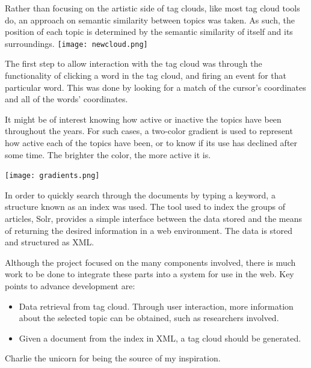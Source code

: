 \documentclass[a0paper, portrait]{baposter}
\begin{document}
\begin{poster}
   {
    Rather than focusing on the artistic side of tag clouds, like most tag cloud tools do, an approach on semantic similarity between topics was taken. As such, the position of each topic is determined by the semantic similarity of itself and its surroundings.
    \newline
    \texttt{[image: newcloud.png]}
  }

   {
    The first step to allow interaction with the tag cloud was through the functionality of clicking a word in the tag cloud, and firing an event for that particular word. This was done by looking for a match of the cursor's coordinates and all of the words' coordinates.  
  }

   {
    It might be of interest knowing how active or inactive the topics have been throughout the years. For such cases, a two-color gradient is used to represent how active each of the topics have been, or to know if its use has declined after some time. The brighter the color, the more active it is. %

    \texttt{[image: gradients.png]}

  }

   {
    In order to quickly search through the documents by typing a keyword, a structure known as an index was used. The tool used to index the groups of articles, Solr, provides a simple interface between the data stored and the means of returning the desired information in a web environment. The data is stored and structured as XML. %

  }
  
   {
    Although the project focused on the many components involved, there is much work to be done to integrate these parts into a system for use in the web. Key points to advance development are:
    \begin{itemize}
      \item Data retrieval from tag cloud. Through user interaction, more information about the selected topic can be obtained, such as researchers involved.
      \item Given a document from the index in XML, a tag cloud should be generated.
    \end{itemize}

  }
  
   {
    {\selectfont Charlie the unicorn for being the source of my inspiration.}
  }

\end{poster}
\end{document}
